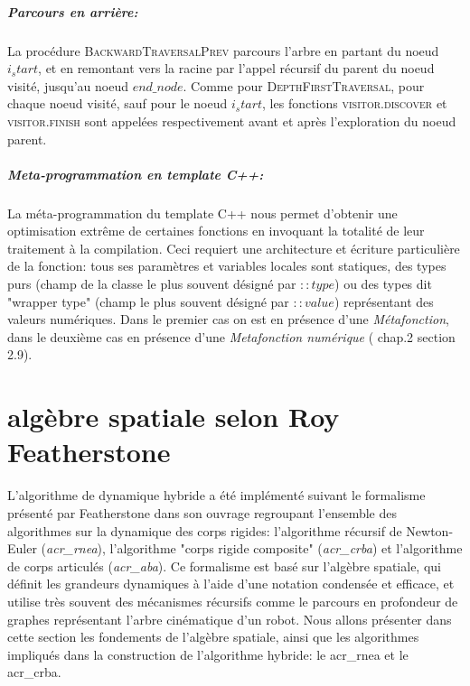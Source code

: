 \documentclass{report}
\begin{document}
\paragraph{Parcours en arrière:}
La procédure \textsc{BackwardTraversalPrev} parcours l'arbre en partant du noeud $i_start$, et en remontant vers la racine par l'appel récursif du parent du noeud visité, jusqu'au noeud $end\_node$. Comme pour \textsc{DepthFirstTraversal}, pour chaque noeud visité, sauf pour le noeud $i_start$, les fonctions \textsc{visitor.discover} et \textsc{visitor.finish} sont appelées respectivement avant et après l'exploration du noeud parent.

\paragraph{Meta-programmation en template C++:}
La méta-programmation du template C++ nous permet d'obtenir une optimisation extrême de certaines fonctions en invoquant la totalité de leur traitement à la compilation. Ceci requiert une architecture et écriture particulière de la fonction: tous ses paramètres et variables locales sont statiques, des types purs (champ de la classe le plus souvent désigné par $::type$) ou des types dit "wrapper type" (champ le plus souvent désigné par $::value$) représentant des valeurs numériques. Dans le premier cas on est en présence d'une \emph{Métafonction}, dans le deuxième cas en présence d'une \emph{Metafonction numérique} (\cite{bib_metaprogramming} chap.2 section 2.9).


\chapter{algèbre spatiale selon Roy Featherstone}


L'algorithme de dynamique hybride a été implémenté suivant le formalisme présenté par Featherstone dans son ouvrage \cite{Featherstone} regroupant l'ensemble des algorithmes sur la dynamique des corps rigides: l'algorithme récursif de Newton-Euler (\emph{\gls{acr_rnea}}), l'algorithme "corps rigide composite" (\emph{\gls{acr_crba}}) et l'algorithme de corps articulés (\emph{\gls{acr_aba}}). Ce formalisme est basé sur l'algèbre spatiale, qui définit les grandeurs dynamiques à l'aide d'une notation condensée et efficace, et utilise très souvent des mécanismes récursifs comme le parcours en profondeur de graphes représentant l'arbre cinématique d'un robot. Nous allons présenter dans cette section les fondements de l'algèbre spatiale, ainsi que les algorithmes impliqués dans la construction de l'algorithme hybride: le \gls{acr_rnea} et le \gls{acr_crba}.\\
\end{document}
